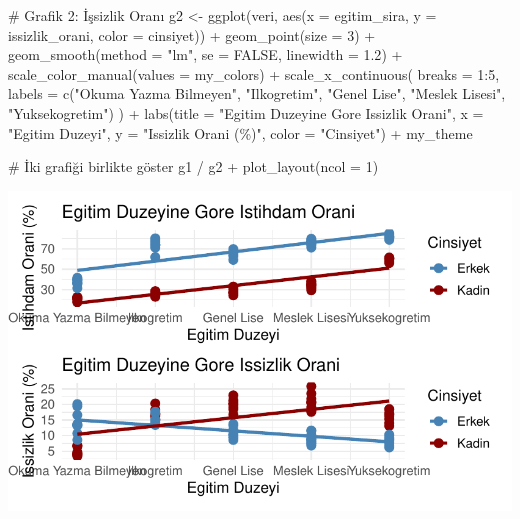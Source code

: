 \documentclass[
  11pt,
  a4paper,
  DIV=11,
  numbers=noendperiod]{scrartcl}
\newenvironment{Shaded}{\begin{snugshade}}{\end{snugshade}}
\newcommand{\AttributeTok}[1]{\textcolor[rgb]{0.40,0.45,0.13}{#1}}
\newcommand{\CommentTok}[1]{\textcolor[rgb]{0.37,0.37,0.37}{#1}}
\newcommand{\ConstantTok}[1]{\textcolor[rgb]{0.56,0.35,0.01}{#1}}
\newcommand{\DecValTok}[1]{\textcolor[rgb]{0.68,0.00,0.00}{#1}}
\newcommand{\FloatTok}[1]{\textcolor[rgb]{0.68,0.00,0.00}{#1}}
\newcommand{\FunctionTok}[1]{\textcolor[rgb]{0.28,0.35,0.67}{#1}}
\newcommand{\NormalTok}[1]{\textcolor[rgb]{0.00,0.23,0.31}{#1}}
\newcommand{\OtherTok}[1]{\textcolor[rgb]{0.00,0.23,0.31}{#1}}
\newcommand{\SpecialCharTok}[1]{\textcolor[rgb]{0.37,0.37,0.37}{#1}}
\newcommand{\StringTok}[1]{\textcolor[rgb]{0.13,0.47,0.30}{#1}}
\begin{document}
\begin{Shaded}
\begin{Highlighting}[]
\CommentTok{\# Grafik 2: İşsizlik Oranı}
\NormalTok{g2 }\OtherTok{\textless{}{-}} \FunctionTok{ggplot}\NormalTok{(veri, }\FunctionTok{aes}\NormalTok{(}\AttributeTok{x =}\NormalTok{ egitim\_sira, }\AttributeTok{y =}\NormalTok{ issizlik\_orani, }\AttributeTok{color =}\NormalTok{ cinsiyet)) }\SpecialCharTok{+}
  \FunctionTok{geom\_point}\NormalTok{(}\AttributeTok{size =} \DecValTok{3}\NormalTok{) }\SpecialCharTok{+}
  \FunctionTok{geom\_smooth}\NormalTok{(}\AttributeTok{method =} \StringTok{"lm"}\NormalTok{, }\AttributeTok{se =} \ConstantTok{FALSE}\NormalTok{, }\AttributeTok{linewidth =} \FloatTok{1.2}\NormalTok{) }\SpecialCharTok{+}
  \FunctionTok{scale\_color\_manual}\NormalTok{(}\AttributeTok{values =}\NormalTok{ my\_colors) }\SpecialCharTok{+}
  \FunctionTok{scale\_x\_continuous}\NormalTok{(}
    \AttributeTok{breaks =} \DecValTok{1}\SpecialCharTok{:}\DecValTok{5}\NormalTok{,}
    \AttributeTok{labels =} \FunctionTok{c}\NormalTok{(}\StringTok{"Okuma Yazma Bilmeyen"}\NormalTok{, }\StringTok{"Ilkogretim"}\NormalTok{, }\StringTok{"Genel Lise"}\NormalTok{, }\StringTok{"Meslek Lisesi"}\NormalTok{, }\StringTok{"Yuksekogretim"}\NormalTok{)}
\NormalTok{  ) }\SpecialCharTok{+}
  \FunctionTok{labs}\NormalTok{(}\AttributeTok{title =} \StringTok{"Egitim Duzeyine Gore Issizlik Orani"}\NormalTok{,}
       \AttributeTok{x =} \StringTok{"Egitim Duzeyi"}\NormalTok{, }\AttributeTok{y =} \StringTok{"Issizlik Orani (\%)"}\NormalTok{, }\AttributeTok{color =} \StringTok{"Cinsiyet"}\NormalTok{) }\SpecialCharTok{+}
\NormalTok{  my\_theme}

\CommentTok{\# İki grafiği birlikte göster}
\NormalTok{g1 }\SpecialCharTok{/}\NormalTok{ g2 }\SpecialCharTok{+} \FunctionTok{plot\_layout}\NormalTok{(}\AttributeTok{ncol =} \DecValTok{1}\NormalTok{)}
\end{Highlighting}
\end{Shaded}

\includegraphics{project_files/figure-pdf/unnamed-chunk-8-1.pdf}
\end{document}
